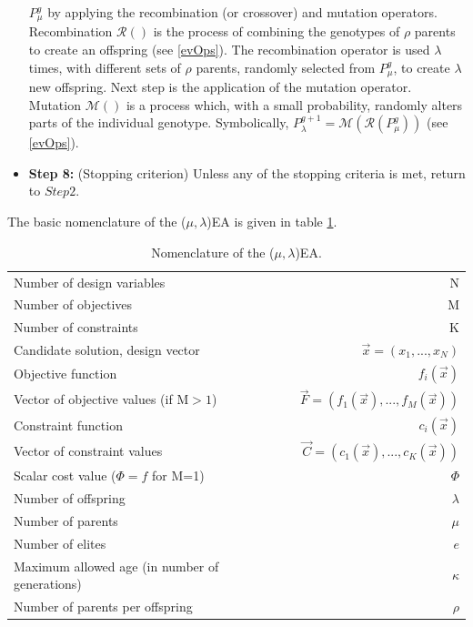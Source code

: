 \begin{itemize}
$P_{\mu}^{g}$  by applying the recombination (or crossover) and mutation operators. Recombination $\mathcal{R}()$ is the process of combining the genotypes of $\rho$ parents to create an offspring (see \ref{evOps}). The recombination operator is used $\lambda$ times, with different sets of $\rho$ parents, randomly selected from $P_{\mu}^{g}$,  to create $\lambda$ new offspring. Next step is the application of the mutation operator. Mutation $\mathcal{M}()$ is a process which, with a small probability, randomly alters parts of the individual genotype. Symbolically, $P_{\lambda}^{g+1} = \mathcal{M}(\mathcal{R}(P_{\mu}^{g}))$ (see \ref{evOps}).
\item[]{\bf Step 8:}  (Stopping criterion) Unless any of the stopping criteria is met, return to $Step 2$.
\end{itemize}

The basic nomenclature of the ($\mu,\lambda$)EA is given in table \ref{GEA nomenclature}. 

\begin{table}[htdp]
\centering
\begin{tabular}{lr} 
\hline
\hline
Number of design variables & N\\
Number of objectives & M\\
Number of constraints   & K\\
\hline
Candidate solution, design vector   & $\vec{x}=(x_1,...,x_N)$\\
Objective function &$f_i(\vec{x})$ \\
Vector of objective values (if M$>\!1$)  &$\vec{F}=(f_1(\vec{x}),...,f_M(\vec{x}))$\\
Constraint function &$c_i(\vec{x})$ \\
Vector of constraint values  & $\vec{C}=(c_1(\vec{x}),...,c_K(\vec{x}))$\\
Scalar cost value ($\Phi\!=\!f$ for M=1) & $\Phi$ \\
\hline
Number of offspring &   $\lambda$ 			\\
Number of parents &  $\mu$ 				\\
Number of elites &  $e$			\\
Maximum allowed age (in number of generations)&  $\kappa$			\\
Number of parents per offspring &  $\rho$			\\
\hline
\hline
\end{tabular}
\caption[GEA nomenclature]{Nomenclature of the ($\mu,\lambda$)EA.}
\label{GEA nomenclature} 
\end{table}
\FloatBarrier


